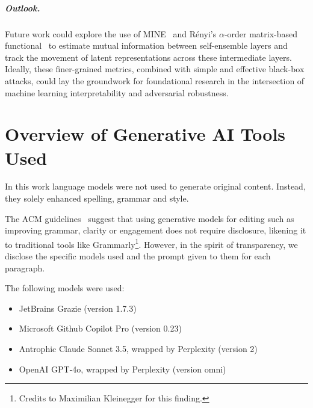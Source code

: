 \documentclass[a4paper, oneside]{discothesis}
\begin{document}
\paragraph{Outlook.}

Future work could explore the use of MINE~\cite{pmlr-v80-belghazi18a} and Rényi's $\alpha$-order matrix-based functional~\cite{6954500} to estimate mutual information between self-ensemble layers and track the movement of latent representations across these intermediate layers. Ideally, these finer-grained metrics, combined with simple and effective black-box attacks, could lay the groundwork for foundational research in the intersection of machine learning interpretability and adversarial robustness.

\bigskip



\appendix


\chapter*{Overview of Generative AI Tools Used}

In this work language models were not used to generate original content. Instead, they solely enhanced spelling, grammar and style.

The ACM guidelines~\cite{acm_authorship_2024} suggest that using generative models for editing \textendash{} such as improving grammar, clarity or engagement \textendash{} does not require disclosure, likening it to traditional tools like Grammarly\footnote{Credits to Maximilian Kleinegger for this finding.}. However, in the spirit of transparency, we disclose the specific models used and the prompt given to them for each paragraph.

The following models were used:

\begin{itemize}
	\item JetBrains Grazie (version 1.7.3)
	\item Microsoft Github Copilot Pro (version 0.23)
	\item Antrophic Claude Sonnet 3.5, wrapped by Perplexity (version 2)
	\item OpenAI GPT-4o, wrapped by Perplexity (version omni)
\end{itemize}
\end{document}
